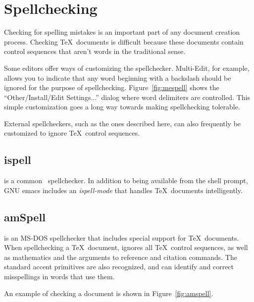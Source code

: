 \section{Spellchecking}

Checking for spelling mistakes is an 
important part of any document
creation process.  Checking \TeX\ documents is difficult because these
documents contain control sequences that aren't words in the
traditional sense.

Some editors offer ways of customizing the spellchecker.  Multi-Edit, for 
example, allows you to indicate that any word beginning with a backslash 
should be ignored for the purpose of spellchecking.  
Figure~\ref{fig:mespell} shows the 
``Other/Install/Edit Settings...'' 
dialog where word delimiters are controlled.  This simple 
customization goes a long way towards making spellchecking tolerable.

External spellcheckers, such as the ones described here, can also 
frequently be customized to ignore \TeX\ control sequences.  


\subsection{ispell}

 is 
a common \Unix\ spellchecker.  In addition to
being available from the shell prompt, GNU emacs 
includes an \textit{ispell-mode} that handles \TeX\ documents intelligently.

\subsection{amSpell}

 is an 
MS-DOS spellchecker that includes special
support for \TeX\ documents.  When spellchecking a \TeX\ document,
 ignores all \TeX\ control sequences, as well as
mathematics and the arguments to reference and citation commands.  The
standard accent primitives are also recognized, and 
can identify and correct misspellings in words that use them.

An example of  checking a document is shown in
Figure~\ref{fig:amspell}.


